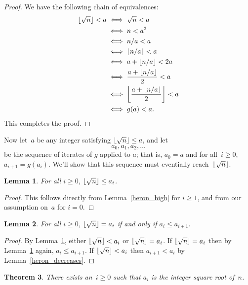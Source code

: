 \documentclass[a4paper]{article}
\DeclarePairedDelimiter\floor{\lfloor}{\rfloor}
\theoremstyle{plain}
\newtheorem{theorem}{Theorem}
\newtheorem{lemma}[theorem]{Lemma}
\theoremstyle{definition}
\begin{document}
\begin{proof}
  We have the following chain of equivalences:
  \begin{align*}
    \floor{\sqrt n} < a &\iff \sqrt n < a \\
                        &\iff n < a^2 \\
                        &\iff n/a < a \\
                        &\iff \floor{n/a} < a \\
                        &\iff a + \floor{n/a} < 2a \\
                        &\iff \frac{a + \floor{n/a}}2 < a \\
                        &\iff \floor*{\frac{a + \floor{n/a}}2} < a \\
                        &\iff g(a) < a.
  \end{align*}
  This completes the proof.
\end{proof}

Now let~$a$ be any integer satisfying $\floor{\sqrt n} \le a$, and let
$$a_0, a_1, a_2, \dots$$ be the sequence of iterates of $g$ applied to $a$;
that is, $a_0 = a$ and for all~$i \ge 0$, $a_{i+1} = g(a_i)$. We'll show that
this sequence must eventially reach~$\floor{\sqrt n}$.

\begin{lemma}\label{sequence_high}
  For all $i\ge 0$, $\floor{\sqrt n} \le a_i$.
\end{lemma}
\begin{proof}
  This follows directly from Lemma~\ref{heron_high} for $i\ge 1$, and
  from our assumption on~$a$ for $i=0$.
\end{proof}

\begin{lemma}\label{isqrt_condition}
  For all $i\ge 0$, $\floor{\sqrt n} = a_i$ if and only if $a_i\le a_{i+1}$.
\end{lemma}

\begin{proof}
  By Lemma~\ref{sequence_high}, either $\floor{\sqrt n} < a_i$ or $\floor{\sqrt
  n} = a_i$. If $\floor{\sqrt n} = a_i$ then by Lemma~\ref{sequence_high}
  again, $a_i \le a_{i+1}$. If $\floor{\sqrt n} < a_i$ then $a_{i+1} < a_i$ by
  Lemma~\ref{heron_decreases}.
\end{proof}

\begin{theorem}
  There exists an~$i\ge 0$ such that $a_i$ is the integer square root of~$n$.
\end{theorem}
\end{document}
